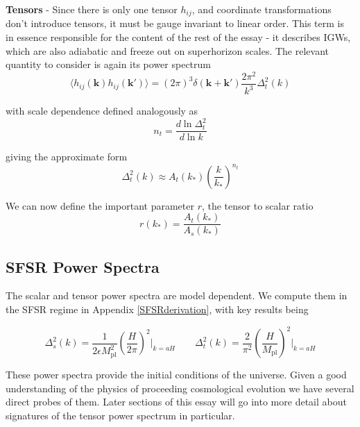 \documentclass[a4paper,10pt]{article}
\renewcommand{\v}[1]{\mathbf{#1}}
\newcommand{\Mp}{M_{\text{pl}}}
\begin{document}
\textbf{Tensors} - Since there is only one tensor $h_{ij}$, and coordinate transformations don't introduce tensors, it must be gauge invariant to linear order. This term is in essence responsible for the content of the rest of the essay - it describes IGWs, which are also adiabatic and freeze out on superhorizon scales. The relevant quantity to consider is again its power spectrum
\begin{equation}
\langle h_{ij}(\v{k})h_{ij}(\v{k'}) \rangle=(2\pi)^3\delta(\v{k}+\v{k'})\frac{2\pi^2}{k^3}\Delta^2_t(k)
\label{tensorpowerspec}
\end{equation}

with scale dependence defined analogously as 
\begin{equation}
n_t = \frac{d\ln{\Delta^2_t}}{d\ln{k}}
\end{equation}

giving the approximate form 
\begin{equation}
\Delta^2_t(k) \approx A_t(k_*)\left(\frac{k}{k_*}\right)^{n_t}
\end{equation}

We can now define the important parameter $r$, the tensor to scalar ratio
\begin{equation}
r(k_*)=\frac{A_t(k_*)}{A_s(k_*)} 
\end{equation}

\subsection{SFSR Power Spectra}

The scalar and tensor power spectra are model dependent. We compute them in the SFSR regime in Appendix \ref{SFSRderivation}, with key results being

\begin{equation}
\Delta^2_{s}(k) = \frac{1}{2\epsilon\Mp^2}\left(\frac{H}{2\pi}\right)^2\rvert_{k=aH} \qquad
\Delta^2_t(k)= \frac{2}{\pi^2}\left(\frac{H}{\Mp}\right)^2\rvert_{k=aH}
\label{bigpowerspectra}
\end{equation}

These power spectra provide the initial conditions of the universe. Given a good understanding of the physics of proceeding cosmological evolution we have several direct probes of them. Later sections of this essay will go into more detail about signatures of the tensor power spectrum in particular.\\
\end{document}
